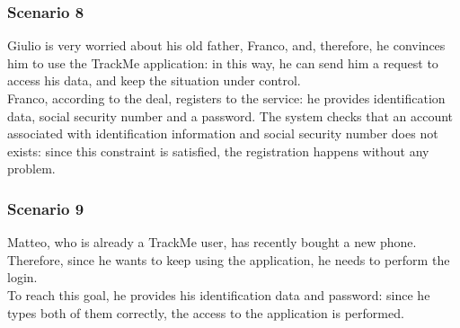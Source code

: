 \subsubsection{Scenario 8}
Giulio is very worried about his old father, Franco, and, therefore, he convinces him to use the TrackMe application: in this way, he can send him a request to access his data, and keep the situation under control. \\
Franco, according to the deal, registers to the service: he provides identification data, social security number and a password. 
The system checks that an account associated with identification information and social security number does not exists: since this constraint is satisfied, the registration happens without any problem.  

\subsubsection{Scenario 9}
Matteo, who is already a TrackMe user, has recently bought a new phone.
Therefore, since he wants to keep using the application, he needs to perform the login.\\
To reach this goal, he provides his identification data and password: since he types both of them correctly, the access to the application is performed. 
